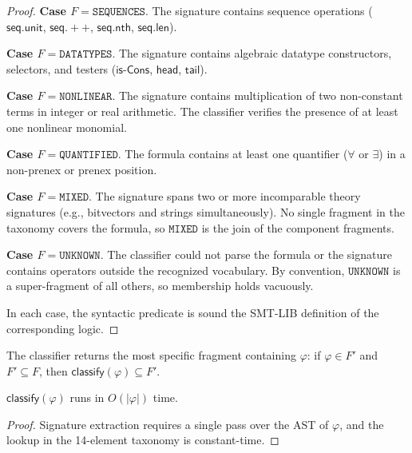 \documentclass[11pt]{article}
\begin{document}
\begin{proof}
\medskip\noindent\textbf{Case $F = \texttt{SEQUENCES}$}.\quad
The signature contains sequence operations
($\mathsf{seq.unit}$, $\mathsf{seq.++}$,
$\mathsf{seq.nth}$, $\mathsf{seq.len}$).

\medskip\noindent\textbf{Case $F = \texttt{DATATYPES}$}.\quad
The signature contains algebraic datatype constructors,
selectors, and testers
($\mathsf{is\text{-}Cons}$, $\mathsf{head}$, $\mathsf{tail}$).

\medskip\noindent\textbf{Case $F = \texttt{NONLINEAR}$}.\quad
The signature contains multiplication of two non-constant
terms in integer or real arithmetic.  The classifier
verifies the presence of at least one nonlinear monomial.

\medskip\noindent\textbf{Case $F = \texttt{QUANTIFIED}$}.\quad
The formula contains at least one quantifier
($\forall$ or $\exists$) in a non-prenex or prenex position.

\medskip\noindent\textbf{Case $F = \texttt{MIXED}$}.\quad
The signature spans two or more incomparable theory
signatures (e.g., bitvectors and strings simultaneously).
No single fragment in the taxonomy covers the formula,
so $\texttt{MIXED}$ is the join of the component fragments.

\medskip\noindent\textbf{Case $F = \texttt{UNKNOWN}$}.\quad
The classifier could not parse the formula or the
signature contains operators outside the recognized
vocabulary.  By convention, $\texttt{UNKNOWN}$ is
a super-fragment of all others, so membership holds
vacuously.

\medskip
In each case, the syntactic predicate is sound \wrt
the SMT-LIB definition of the corresponding logic.
\end{proof}

\begin{theorem}\label{thm:classify-complete}
The classifier returns the most specific fragment containing
$\varphi$: if $\varphi \in F'$ and $F' \subseteq F$, then
$\mathsf{classify}(\varphi) \subseteq F'$.
\end{theorem}

\begin{lemma}\label{lem:classify-cost}
$\mathsf{classify}(\varphi)$ runs in $O(|\varphi|)$ time.
\end{lemma}

\begin{proof}
Signature extraction requires a single pass over the AST
of $\varphi$, and the lookup in the 14-element taxonomy
is constant-time.
\end{proof}
\end{document}
